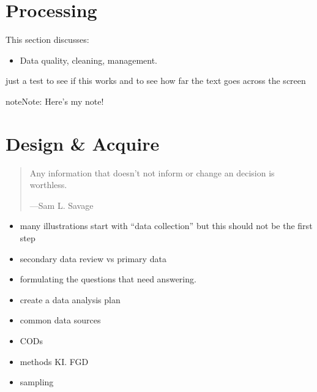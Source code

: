 \documentclass[letterpaper,10pt,english]{jupyterBook}
\begin{document}
\chapter{Processing}
\label{\detokenize{part1/what is information management:processing}}
\sphinxAtStartPar
This section discusses:
\begin{itemize}
\item {} 
\sphinxAtStartPar
Data quality, cleaning, management.

\end{itemize}

\begin{sphinxShadowBox}

\sphinxAtStartPar
just a test to see if this works and to see how far the text goes across the screen
\end{sphinxShadowBox}

\begin{sphinxShadowBox}
\sphinxstylesidebartitle{}

\begin{sphinxadmonition}{note}{Note:}
\sphinxAtStartPar
Here’s my note!
\end{sphinxadmonition}
\end{sphinxShadowBox}


\chapter{Design \& Acquire}
\label{\detokenize{part1/design:design-acquire}}\label{\detokenize{part1/design::doc}}\begin{quote}

\sphinxAtStartPar
Any information that doesn’t not inform or change an decision is worthless.

\begin{flushright}
---Sam L. Savage
\end{flushright}
\end{quote}
\begin{itemize}
\item {} 
\sphinxAtStartPar
many illustrations start with “data collection” but this should not be the first step

\item {} 
\sphinxAtStartPar
secondary data review vs primary data

\item {} 
\sphinxAtStartPar
formulating the questions that need answering.

\item {} 
\sphinxAtStartPar
create a data analysis plan

\item {} 
\sphinxAtStartPar
common data sources

\item {} 
\sphinxAtStartPar
CODs

\item {} 
\sphinxAtStartPar
methods \sphinxhyphen{} KI. FGD

\item {} 
\sphinxAtStartPar
sampling

\end{itemize}
\end{document}
